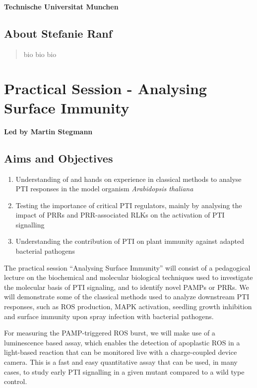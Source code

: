 \documentclass[12pt,]{book}
\providecommand{\tightlist}{%
  \setlength{\itemsep}{0pt}\setlength{\parskip}{0pt}}
\begin{document}
\textbf{Technische Universitat Munchen}

\subsection*{About Stefanie Ranf}\label{about-stefanie-ranf}

\begin{quote}
bio bio bio
\end{quote}

\section*{Practical Session - Analysing Surface
Immunity}\label{practical-session---analysing-surface-immunity}

\textbf{Led by Martin Stegmann}

\subsection*{Aims and Objectives}\label{aims-and-objectives-3}

\begin{enumerate}
\def\labelenumi{\arabic{enumi}.}
\tightlist
\item
  Understanding of and hands on experience in classical methods to
  analyse PTI responses in the model organism \emph{Arabidopsis
  thaliana}
\item
  Testing the importance of critical PTI regulators, mainly by analysing
  the impact of PRRs and PRR-associated RLKs on the activation of PTI
  signalling
\item
  Understanding the contribution of PTI on plant immunity against
  adapted bacterial pathogens
\end{enumerate}

The practical session ``Analysing Surface Immunity'' will consist of a
pedagogical lecture on the biochemical and molecular biological
techniques used to investigate the molecular basis of PTI signaling, and
to identify novel PAMPs or PRRs. We will demonstrate some of the
classical methods used to analyze downstream PTI responses, such as ROS
production, MAPK activation, seedling growth inhibition and surface
immunity upon spray infection with bacterial pathogens.

For measuring the PAMP-triggered ROS burst, we will make use of a
luminescence based assay, which enables the detection of apoplastic ROS
in a light-based reaction that can be monitored live with a
charge-coupled device camera. This is a fast and easy quantitative assay
that can be used, in many cases, to study early PTI signalling in a
given mutant compared to a wild type control.
\end{document}
